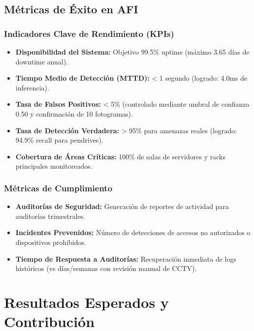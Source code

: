 \documentclass[12pt, a4paper]{article}
\begin{document}
\begin{itemize}
\subsection{Métricas de Éxito en AFI}

\subsubsection{Indicadores Clave de Rendimiento (KPIs)}
\begin{itemize}
\item \textbf{Disponibilidad del Sistema:} Objetivo 99.5\% uptime (máximo 3.65 días de downtime anual).
\item \textbf{Tiempo Medio de Detección (MTTD):} < 1 segundo (logrado: 4.0ms de inferencia).
\item \textbf{Tasa de Falsos Positivos:} < 5\% (controlado mediante umbral de confianza 0.50 y confirmación de 10 fotogramas).
\item \textbf{Tasa de Detección Verdadera:} > 95\% para amenazas reales (logrado: 94.9\% recall para pendrives).
\item \textbf{Cobertura de Áreas Críticas:} 100\% de salas de servidores y racks principales monitoreados.
\end{itemize}

\subsubsection{Métricas de Cumplimiento}
\begin{itemize}
\item \textbf{Auditorías de Seguridad:} Generación de reportes de actividad para auditorías trimestrales.
\item \textbf{Incidentes Prevenidos:} Número de detecciones de accesos no autorizados o dispositivos prohibidos.
\item \textbf{Tiempo de Respuesta a Auditorías:} Recuperación inmediata de logs históricos (vs días/semanas con revisión manual de CCTV).
\end{itemize}

\section{Resultados Esperados y Contribución}


\end{itemize}
\end{document}
